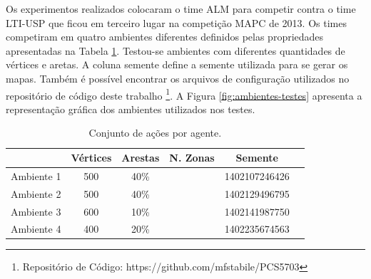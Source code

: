 \documentclass{llncs}
\begin{document}
Os experimentos realizados colocaram o time ALM para competir contra o time LTI-USP que ficou em terceiro lugar na competição MAPC de 2013. Os times competiram em quatro ambientes diferentes definidos pelas propriedades apresentadas na Tabela \ref{table:ambientes}. Testou-se ambientes com diferentes quantidades de vértices e aretas. A coluna semente define a semente utilizada para se gerar os mapas. Também é possível encontrar os arquivos de configuração utilizados no repositório de código deste trabalho \footnote{Repositório de Código: https://github.com/mfstabile/PCS5703}. A Figura \ref{fig:ambientes-testes} apresenta a representação gráfica dos ambientes utilizados nos testes.

\begin{table}[!h]
\centering
\begin{tabular}{|c|c|c|c|c|c|}
  \hline
             & Vértices & Arestas & N. Zonas &    Semente    \\ \hline
  Ambiente 1 &   500    &   40\%  &          & 1402107246426 \\ \hline
  Ambiente 2 &   500    &   40\%  &          & 1402129496795 \\ \hline
  Ambiente 3 &   600    &   10\%  &          & 1402141987750 \\ \hline
  Ambiente 4 &   400    &   20\%  &          & 1402235674563 \\ \hline
\end{tabular}
\caption{Conjunto de ações por agente.}
\label{table:ambientes}
\end{table}
\end{document}

